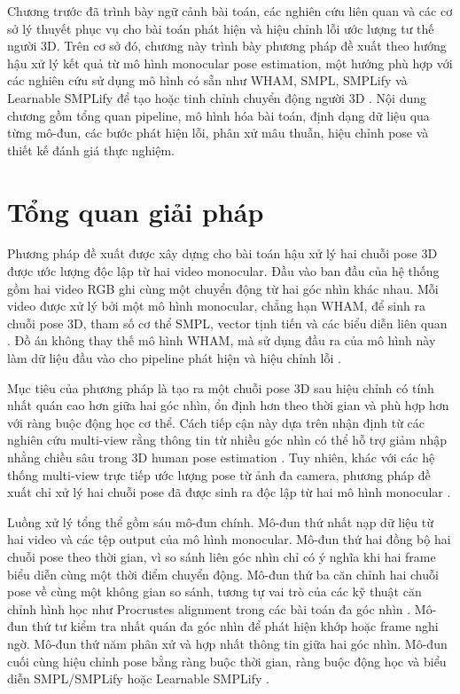 \documentclass[../DoAn.tex]{subfiles}
\begin{document}
Chương trước đã trình bày ngữ cảnh bài toán, các nghiên cứu liên quan và các cơ sở lý thuyết phục vụ cho bài toán phát hiện và hiệu chỉnh lỗi ước lượng tư thế người 3D. Trên cơ sở đó, chương này trình bày phương pháp đề xuất theo hướng hậu xử lý kết quả từ mô hình monocular pose estimation, một hướng phù hợp với các nghiên cứu sử dụng mô hình có sẵn như WHAM, SMPL, SMPLify và Learnable SMPLify để tạo hoặc tinh chỉnh chuyển động người 3D \cite{shin2024wham,smpl2015,smplify2016,yang2025learnable}. Nội dung chương gồm tổng quan pipeline, mô hình hóa bài toán, định dạng dữ liệu qua từng mô-đun, các bước phát hiện lỗi, phân xử mâu thuẫn, hiệu chỉnh pose và thiết kế đánh giá thực nghiệm.

\section{Tổng quan giải pháp}
\label{sec:method_overview}

Phương pháp đề xuất được xây dựng cho bài toán hậu xử lý hai chuỗi pose 3D được ước lượng độc lập từ hai video monocular. Đầu vào ban đầu của hệ thống gồm hai video RGB ghi cùng một chuyển động từ hai góc nhìn khác nhau. Mỗi video được xử lý bởi một mô hình monocular, chẳng hạn WHAM, để sinh ra chuỗi pose 3D, tham số cơ thể SMPL, vector tịnh tiến và các biểu diễn liên quan \cite{shin2024wham,smpl2015}. Đồ án không thay thế mô hình WHAM, mà sử dụng đầu ra của mô hình này làm dữ liệu đầu vào cho pipeline phát hiện và hiệu chỉnh lỗi \cite{vu2026multiperspective}.

Mục tiêu của phương pháp là tạo ra một chuỗi pose 3D sau hiệu chỉnh có tính nhất quán cao hơn giữa hai góc nhìn, ổn định hơn theo thời gian và phù hợp hơn với ràng buộc động học cơ thể. Cách tiếp cận này dựa trên nhận định từ các nghiên cứu multi-view rằng thông tin từ nhiều góc nhìn có thể hỗ trợ giảm nhập nhằng chiều sâu trong 3D human pose estimation \cite{canonpose2021,mtftransformer2023,gu2024multiview}. Tuy nhiên, khác với các hệ thống multi-view trực tiếp ước lượng pose từ ảnh đa camera, phương pháp đề xuất chỉ xử lý hai chuỗi pose đã được sinh ra độc lập từ hai mô hình monocular \cite{vu2026multiperspective}.

Luồng xử lý tổng thể gồm sáu mô-đun chính. Mô-đun thứ nhất nạp dữ liệu từ hai video và các tệp output của mô hình monocular. Mô-đun thứ hai đồng bộ hai chuỗi pose theo thời gian, vì so sánh liên góc nhìn chỉ có ý nghĩa khi hai frame biểu diễn cùng một thời điểm chuyển động. Mô-đun thứ ba căn chỉnh hai chuỗi pose về cùng một không gian so sánh, tương tự vai trò của các kỹ thuật căn chỉnh hình học như Procrustes alignment trong các bài toán đa góc nhìn \cite{gu2024multiview}. Mô-đun thứ tư kiểm tra nhất quán đa góc nhìn để phát hiện khớp hoặc frame nghi ngờ. Mô-đun thứ năm phân xử và hợp nhất thông tin giữa hai góc nhìn. Mô-đun cuối cùng hiệu chỉnh pose bằng ràng buộc thời gian, ràng buộc động học và biểu diễn SMPL/SMPLify hoặc Learnable SMPLify \cite{smpl2015,smplify2016,yang2025learnable}.
\end{document}
